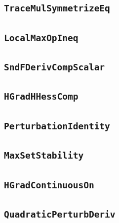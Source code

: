 \documentclass[11pt]{amsart}
\theoremstyle{definition}
\begin{document}
\subsection{\texorpdfstring{\texttt{TraceMulSymmetrizeEq}}{TraceMulSymmetrizeEq}}\label{node:TraceMulSymmetrizeEq}


\subsection{\texorpdfstring{\texttt{LocalMaxOpIneq}}{LocalMaxOpIneq}}\label{node:LocalMaxOpIneq}


\subsection{\texorpdfstring{\texttt{SndFDerivCompScalar}}{SndFDerivCompScalar}}\label{node:SndFDerivCompScalar}


\subsection{\texorpdfstring{\texttt{HGradHHessComp}}{HGradHHessComp}}\label{node:HGradHHessComp}


\subsection{\texorpdfstring{\texttt{PerturbationIdentity}}{PerturbationIdentity}}\label{node:PerturbationIdentity}


\subsection{\texorpdfstring{\texttt{MaxSetStability}}{MaxSetStability}}\label{node:MaxSetStability}


\subsection{\texorpdfstring{\texttt{HGradContinuousOn}}{HGradContinuousOn}}\label{node:HGradContinuousOn}


\subsection{\texorpdfstring{\texttt{QuadraticPerturbDeriv}}{QuadraticPerturbDeriv}}\label{node:QuadraticPerturbDeriv}

\end{document}
